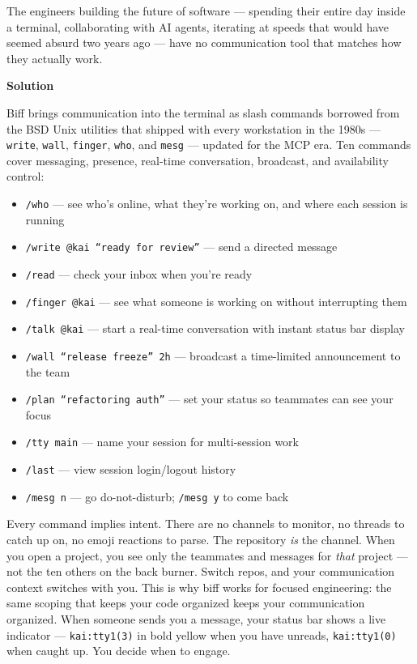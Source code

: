 \documentclass[11pt,letterpaper]{article}
\newcommand{\prsection}[1]{%
  \vspace{1em}%
  {\large\bfseries\color{SectionBlue}#1}%
  \vspace{0.3em}\par%
}
\begin{document}
The engineers building the future of software --- spending their entire day
inside a terminal, collaborating with AI agents, iterating at speeds that
would have seemed absurd two years ago --- have no communication tool that
matches how they actually work.

\prsection{Solution}

Biff brings communication into the terminal as slash commands borrowed from
the BSD Unix utilities that shipped with every workstation in the 1980s ---
\texttt{write}, \texttt{wall}, \texttt{finger}, \texttt{who}, and
\texttt{mesg} --- updated for the MCP era. Ten commands cover messaging,
presence, real-time conversation, broadcast, and availability control:

\begin{itemize}[leftmargin=1.5em, itemsep=0.2em]
  \item \texttt{/who} --- see who's online, what they're working on, and
    where each session is running
  \item \texttt{/write @kai ``ready for review''} --- send a directed
    message
  \item \texttt{/read} --- check your inbox when you're ready
  \item \texttt{/finger @kai} --- see what someone is working on without
    interrupting them
  \item \texttt{/talk @kai} --- start a real-time conversation with instant
    status bar display
  \item \texttt{/wall ``release freeze'' 2h} --- broadcast a time-limited
    announcement to the team
  \item \texttt{/plan ``refactoring auth''} --- set your status so
    teammates can see your focus
  \item \texttt{/tty main} --- name your session for multi-session work
  \item \texttt{/last} --- view session login/logout history
  \item \texttt{/mesg n} --- go do-not-disturb; \texttt{/mesg y} to
    come back
\end{itemize}

Every command implies intent. There are no channels to monitor, no threads
to catch up on, no emoji reactions to parse. The repository \emph{is} the
channel. When you open a project, you see only the teammates and messages
for \emph{that} project --- not the ten others on the back burner. Switch
repos, and your communication context switches with you. This is why biff
works for focused engineering: the same scoping that keeps your code
organized keeps your communication organized. When someone sends you a
message, your status bar shows a live indicator ---
\texttt{kai:tty1(3)} in bold yellow when you have unreads,
\texttt{kai:tty1(0)} when caught up. You decide when to engage.
\end{document}
